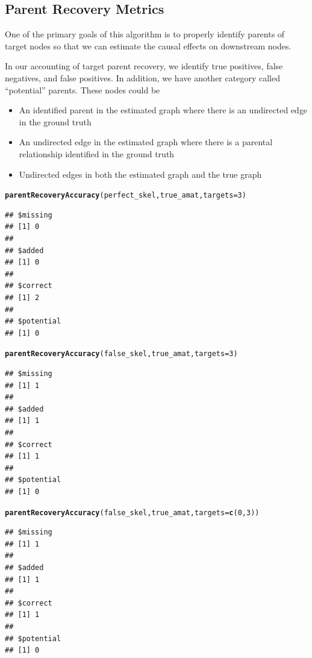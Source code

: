 \documentclass[12pt]{article}\usepackage[]{graphicx}\usepackage[]{xcolor}
\makeatletter
\newcommand{\hlnum}[1]{\textcolor[rgb]{0.686,0.059,0.569}{#1}}%
\newcommand{\hlstd}[1]{\textcolor[rgb]{0.345,0.345,0.345}{#1}}%
\newcommand{\hlkwc}[1]{\textcolor[rgb]{0.333,0.667,0.333}{#1}}%
\newcommand{\hlkwd}[1]{\textcolor[rgb]{0.737,0.353,0.396}{\textbf{#1}}}%
\newenvironment{kframe}{%
 \def\at@end@of@kframe{}%
 \ifinner\ifhmode%
  \def\at@end@of@kframe{\end{minipage}}%
  \begin{minipage}{\columnwidth}%
 \fi\fi%
 \def\FrameCommand##1{\hskip\@totalleftmargin \hskip-\fboxsep
 \colorbox{shadecolor}{##1}\hskip-\fboxsep
     \hskip-\linewidth \hskip-\@totalleftmargin \hskip\columnwidth}%
 \MakeFramed {\advance\hsize-\width
   \@totalleftmargin\z@ \linewidth\hsize
   \@setminipage}}%
 {\par\unskip\endMakeFramed%
 \at@end@of@kframe}
\newenvironment{knitrout}{}{} %
\makeatother
\begin{document}
\subsection*{Parent Recovery Metrics}
One of the primary goals of this algorithm is to properly identify parents of target nodes so that we can estimate the causal effects on downstream nodes.

In our accounting of target parent recovery, we identify true positives, false negatives, and false positives. In addition, we have another category called ``potential'' parents. These nodes could be 
\begin{itemize}
\item An identified parent in the estimated graph where there is an undirected edge in the ground truth
\item An undirected edge in the estimated graph where there is a parental relationship identified in the ground truth
\item Undirected edges in both the estimated graph and the true graph
\end{itemize}

\begin{knitrout}
\color{fgcolor}\begin{kframe}
\begin{alltt}
\hlkwd{parentRecoveryAccuracy}\hlstd{(perfect_skel,true_amat,}\hlkwc{targets} \hlstd{=} \hlnum{3}\hlstd{)}
\end{alltt}
\begin{verbatim}
## $missing
## [1] 0
## 
## $added
## [1] 0
## 
## $correct
## [1] 2
## 
## $potential
## [1] 0
\end{verbatim}
\begin{alltt}
\hlkwd{parentRecoveryAccuracy}\hlstd{(false_skel,true_amat,}\hlkwc{targets} \hlstd{=} \hlnum{3}\hlstd{)}
\end{alltt}
\begin{verbatim}
## $missing
## [1] 1
## 
## $added
## [1] 1
## 
## $correct
## [1] 1
## 
## $potential
## [1] 0
\end{verbatim}
\begin{alltt}
\hlkwd{parentRecoveryAccuracy}\hlstd{(false_skel,true_amat,}\hlkwc{targets} \hlstd{=} \hlkwd{c}\hlstd{(}\hlnum{0}\hlstd{,}\hlnum{3}\hlstd{))}
\end{alltt}
\begin{verbatim}
## $missing
## [1] 1
## 
## $added
## [1] 1
## 
## $correct
## [1] 1
## 
## $potential
## [1] 0
\end{verbatim}
\end{kframe}
\end{knitrout}
\end{document}
